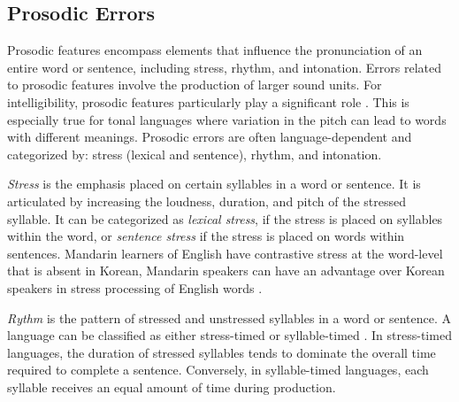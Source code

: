 \documentclass[11pt]{article}
\begin{document}
\subsection*{Prosodic Errors}


Prosodic features encompass elements that influence the pronunciation of an entire word or sentence, including stress, rhythm, and intonation. Errors related to prosodic features involve the production of larger sound units. For intelligibility, prosodic features particularly play a significant role \cite{raux2002automatic}. This is especially true for tonal languages \cite{dahmen2023prosodic} where 
variation in the pitch can lead to words with different meanings. %
Prosodic errors are often language-dependent and categorized by: stress (lexical and sentence), rhythm, and intonation.

\textit{Stress} is the emphasis placed on certain syllables in a word or sentence. It is articulated by increasing the loudness, duration, and pitch of the stressed syllable. It can be categorized as \textit{lexical stress}, if the stress is placed on syllables within the word, or \textit{sentence stress} if the stress is placed on words within sentences. Mandarin learners of English have contrastive stress at the word-level that is absent in Korean, Mandarin speakers can have an advantage over Korean speakers in stress processing of English words \cite{wang2022segmental}. 


\textit{Rythm} is the pattern of stressed and unstressed syllables in a word or sentence. A language can be classified as either stress-timed or syllable-timed \cite{ohata2004phonological, matthews2014concise}. In stress-timed languages, the duration of stressed syllables tends to dominate the overall time required to complete a sentence. Conversely, in syllable-timed languages, each syllable receives an equal amount of time during production. 
\end{document}
